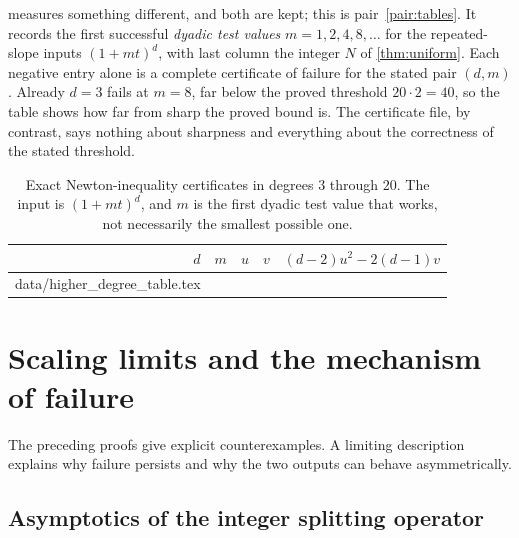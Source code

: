 \documentclass[11pt,letterpaper]{article}
\makeatletter
\let\tableinput\@@input
\numberwithin{equation}{section}
\theoremstyle{definition}
\theoremstyle{remark}
\makeatother
\begin{document}
 measures something different, and both are kept; this is
pair~\ref{pair:tables}. It records the first successful \emph{dyadic test
values} $m=1,2,4,8,\ldots$ for the repeated-slope inputs $(1+mt)^d$, with last
column the integer $N$ of \cref{thm:uniform}. Each negative entry alone is a
complete certificate of failure for the stated pair $(d,m)$. Already $d=3$
fails at $m=8$, far below the proved threshold $20\cdot2=40$, so the table
shows how far from sharp the proved bound is. The certificate file, by
contrast, says nothing about sharpness and everything about the correctness of
the stated threshold.

\begin{table}[htbp]
\centering
\small
\begin{tabular}{@{}rrrrr@{}}
\toprule
$d$ & $m$ & $u$ & $v$ & $(d-2)u^2-2(d-1)v$\\
\midrule
\tableinput data/higher_degree_table.tex
\bottomrule
\end{tabular}
\caption{Exact Newton-inequality certificates in degrees $3$ through $20$.
The input is $(1+mt)^d$, and $m$ is the first dyadic test value that works,
not necessarily the smallest possible one.}
\label{tab:higher}
\end{table}

\section{Scaling limits and the mechanism of failure}\label{sec:scaling}

The preceding proofs give explicit counterexamples. A limiting description
explains why failure persists and why the two outputs can behave
asymmetrically.

\subsection{Asymptotics of the integer splitting operator}
\end{document}
